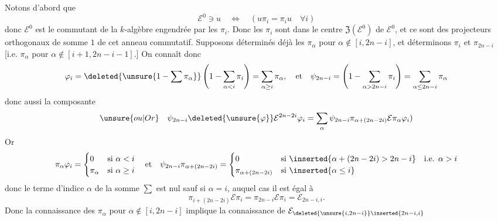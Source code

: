 Notons d'abord que
\[
\mathcal E^0\ni u\quad\Longleftrightarrow\quad(u\pi_i=\pi_i u\quad\forall i)
\]
donc $\mathcal E^0$ est le commutant de la $k$-algèbre engendrée par les $\pi_i$. Donc les $\pi_i$ sont dans le centre $\mathfrak Z(\mathcal E^0)$ de $\mathcal E^0$, et ce sont des projecteurs  orthogonaux de somme $1$ de cet anneau commutatif. Supposons déterminés déjà les $\pi_\alpha$ pour $\alpha\notin[i,2n-i]$,  et déterminons $\pi_i$ et $\pi_{2n-i}$ [i.e. $\pi_\alpha$ pour $\alpha\notin[i+1,2n-i-1]$.]
On connaît donc
\[
\varphi_i=\deleted{\unsure{1-\sum\pi_\alpha}}\left(1-\sum_{\alpha<i}\pi_i\right)=\sum_{\alpha\geq i}\pi_\alpha,
\quad\text{et}\quad
\psi_{2n-i}=\left(1-\sum_{\alpha>2n-i}\pi_i\right)=\sum_{\alpha\leq 2n-i}\pi_\alpha
\]
donc aussi la composante
\[
\unsure{ou|Or}\quad\psi_{2n-i}\deleted{\unsure{\varphi}}\mathcal E^{2n-2i}\varphi_i
=\sum_\alpha\psi_{2n-i}\pi_{\alpha+(2n-2i)}\mathcal E\pi_\alpha\varphi_i)
\]
Or
\[
\pi_\alpha\varphi_i=\begin{cases}0&\text{si }\alpha<i\\\pi_\alpha&\text{si }\alpha\geq i\end{cases}
\quad\text{et}\quad
\psi_{2n-i}\pi_{\alpha+(2n-2i)}=
\begin{cases}
0&\text{si }\inserted{\alpha+(2n-2i)>2n-i}\quad\text{i.e. }\alpha>i\\
\pi_{\alpha+(2n-2i)}&\text{si }\inserted{\alpha\leq i}
\end{cases}
\]
donc le terme d'indice $\alpha$ de la somme $\sum$ est nul sauf si $\alpha=i$, auquel cas il est égal à
\[
\pi_{i+(2n-2i)}\mathcal E\pi_i=\pi_{2n-i}\mathcal E\pi_i=\mathcal E_{2n-i,i}.
\]
Donc la connaissance des $\pi_\alpha$ pour $\alpha\notin[i,2n-i]$ implique la connaissance de $\mathcal E_{\deleted{\unsure{i,2n-i}}\inserted{2n-i,i}}$ 

